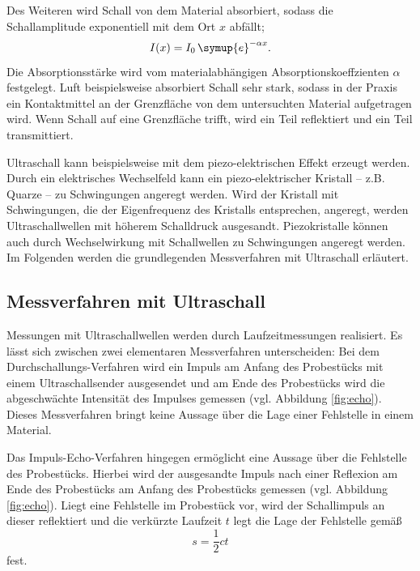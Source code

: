 Des Weiteren wird Schall von dem Material absorbiert, sodass die Schallamplitude exponentiell
mit dem Ort $x$ abfällt;
\begin{equation}
	\label{eqn:dampf}
	I(x) = I_0 \, \symup{e}^{-\alpha x} \mathrm{.}
\end{equation}
Die Absorptionsstärke wird vom materialabhängigen Absorptionskoeffzienten $\alpha$ festgelegt.
Luft beispielsweise absorbiert Schall sehr stark, sodass in der Praxis ein Kontaktmittel an der
Grenzfläche von dem untersuchten Material aufgetragen wird.
Wenn Schall auf eine Grenzfläche trifft, wird ein Teil reflektiert
und ein Teil transmittiert.

Ultraschall kann beispielsweise mit dem piezo-elektrischen Effekt erzeugt werden.
Durch ein elektrisches Wechselfeld kann ein piezo-elektrischer Kristall -- z.B. Quarze -- zu
Schwingungen angeregt werden. Wird der Kristall mit
Schwingungen, die der Eigenfrequenz des Kristalls entsprechen, angeregt, werden
Ultraschallwellen mit höherem Schalldruck ausgesandt. Piezokristalle können auch durch
Wechselwirkung mit Schallwellen zu Schwingungen angeregt werden.
Im Folgenden werden die grundlegenden Messverfahren mit Ultraschall erläutert.
\subsection{Messverfahren mit Ultraschall}
Messungen mit Ultraschallwellen werden durch Laufzeitmessungen realisiert.
Es lässt sich zwischen zwei elementaren Messverfahren unterscheiden:
Bei dem Durchschallungs-Verfahren wird ein Impuls am Anfang des Probestücks mit einem
Ultraschallsender ausgesendet
und am Ende des Probestücks wird die abgeschwächte Intensität des Impulses gemessen (vgl.
Abbildung \ref{fig:echo}).
Dieses Messverfahren bringt keine Aussage über die Lage einer Fehlstelle in einem
Material.

Das Impuls-Echo-Verfahren hingegen ermöglicht eine Aussage über die Fehlstelle des Probestücks.
Hierbei wird der ausgesandte Impuls nach einer Reflexion am Ende des Probestücks am Anfang des
Probestücks gemessen (vgl. Abbildung \ref{fig:echo}).
Liegt eine Fehlstelle im Probestück vor, wird der Schallimpuls an dieser reflektiert und die
verkürzte Laufzeit $t$ legt die Lage der Fehlstelle gemäß
\begin{equation}
	\label{eqn:laufzeit}
	s = \frac{1}{2} c t
\end{equation}
fest.

